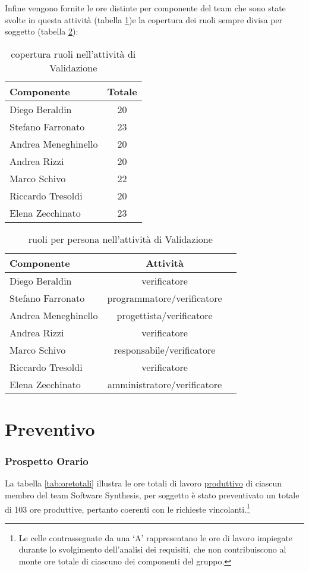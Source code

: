Infine vengono fornite le ore distinte per componente del team che sono state svolte in questa attività (tabella \ref{tab:ruolivv2})e la copertura dei ruoli sempre divisa per soggetto (tabella \ref{tab:ruolivv3}):

\begin{table}[h]
\centering
\begin{tabular}{|l|c|}
\hline
Componente& Totale \\
\hline
Diego Beraldin & 20\\
Stefano Farronato & 23\\
Andrea Meneghinello & 20\\
Andrea Rizzi & 20\\
Marco Schivo & 22\\
Riccardo Tresoldi & 20\\
Elena Zecchinato & 23\\
\hline
\end{tabular}
\caption{copertura ruoli nell'attività di Validazione}\label{tab:ruolivv2}
\end{table}

\begin{table}[h!]
\centering
\begin{tabular}{|l|c|c|}
\hline
Componente& Attività\\
\hline
Diego Beraldin &verificatore\\
Stefano Farronato & programmatore/verificatore\\
Andrea Meneghinello &progettista/verificatore\\
Andrea Rizzi &verificatore\\
Marco Schivo &responsabile/verificatore\\
Riccardo Tresoldi &verificatore\\
Elena Zecchinato &amministratore/verificatore\\
\hline
\end{tabular}
\caption{ruoli per persona nell'attività di Validazione}\label{tab:ruolivv3}
\end{table}
\clearpage

\section{Preventivo}

\subsubsection{Prospetto Orario}
La tabella \ref{tab:oretotali} illustra le ore totali di lavoro \underline{produttivo} di ciascun membro del team Software Synthesis, per soggetto è stato preventivato un totale di 103 ore produttive, pertanto coerenti con le richieste vincolanti.\footnote{%
  Le celle contrassegnate da una `A' rappresentano le ore di lavoro impiegate durante lo svolgimento dell'analisi dei requisiti, che non contribuiscono al monte ore totale di ciascuno dei componenti del gruppo.
}

